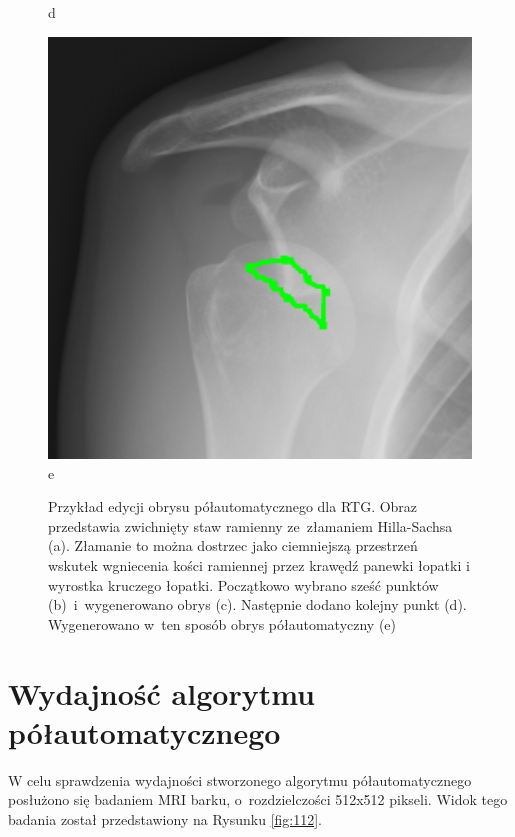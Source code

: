 \documentclass[a4paper,11pt,twoside,openright]{report}
\theoremstyle{definition}
\begin{document}
\begin{figure}[h!]
\begin{center}
\begin{center}
		d
	\end{center}
	\endminipage\hfill
	\begin{center}
		\includegraphics[width=1.0\textwidth]{183}
		e
	\end{center}
	\endminipage\hfill
	\caption{Przykład edycji obrysu półautomatycznego dla RTG. Obraz przedstawia zwichnięty staw
	ramienny ze~złamaniem Hilla-Sachsa (a). Złamanie to można dostrzec jako ciemniejszą przestrzeń
	wskutek wgniecenia kości ramiennej przez krawędź panewki łopatki i wyrostka kruczego łopatki.
	Początkowo wybrano sześć punktów
	(b)~i~wygenerowano obrys (c). Następnie dodano kolejny punkt (d).
	Wygenerowano w~ten sposób obrys półautomatyczny (e)}
	\label{fig:179}
\end{center}
\end{figure}

\section {Wydajność algorytmu półautomatycznego}

W celu sprawdzenia wydajności stworzonego algorytmu półautomatycznego posłużono
się badaniem MRI barku, o~rozdzielczości 512x512 pikseli. Widok tego badania został przedstawiony
na Rysunku \ref{fig:112}.
\end{document}
